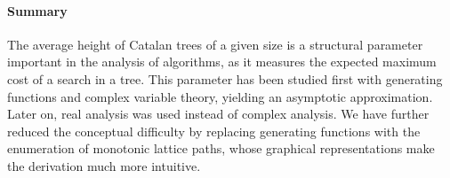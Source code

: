 
\paragraph{Summary}

The average height of Catalan trees of a given size is a structural
parameter important in the analysis of algorithms, as it measures the
expected maximum cost of a search in a tree. This parameter has been
studied first with generating functions and complex variable theory,
yielding an asymptotic approximation. Later on, real analysis was used
instead of complex analysis. We have further reduced the conceptual
difficulty by replacing generating functions with the enumeration of
monotonic lattice paths, whose graphical representations make the
derivation much more intuitive.

